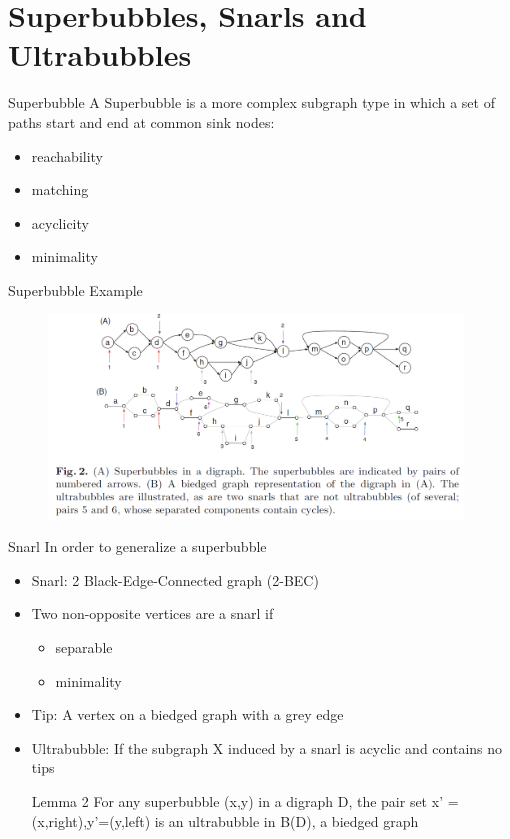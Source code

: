 \documentclass{beamer}
\begin{document}
\section{Superbubbles, Snarls and Ultrabubbles}
\begin{frame}{Superbubble}
    A Superbubble is a more complex subgraph type in which a set of paths start and end at common sink nodes:
\begin{itemize}
    \item reachability
    \item matching
    \item acyclicity 
    \item minimality
\end{itemize}
\end{frame}
\begin{frame}{Superbubble Example}
\begin{figure}[H]
\centering
\includegraphics[width=110mm]{Superbubbles.png}
\end{figure}

\end{frame}
\begin{frame}{Snarl}
In order to generalize a superbubble
\begin{itemize}
    \item Snarl: 2 Black-Edge-Connected graph (2-BEC)
    \item Two non-opposite vertices are a snarl if
    \begin{itemize}
        \item separable
        \item minimality
    \end{itemize}
    \item Tip: A vertex on a biedged graph with a grey edge
    \item Ultrabubble: If the subgraph X induced by a snarl is acyclic and contains no tips
    \begin{block}{Lemma 2}
    For any superbubble (x,y) in a digraph D, the pair set {x' = (x,right),y'=(y,left)} is an ultrabubble in B(D), a biedged graph
    \end{block}
\end{itemize}
\end{frame}
\end{document}
